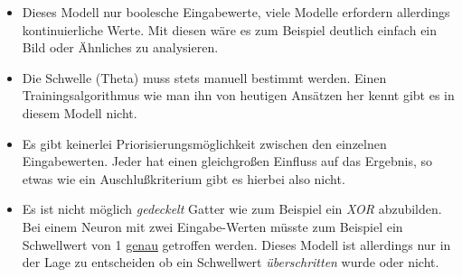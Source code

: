 \begin{minipage}{\textwidth}
\begin{itemize}

\item Dieses Modell  nur boolesche Eingabewerte, viele Modelle erfordern allerdings kontinuierliche Werte. Mit diesen wäre es zum Beispiel deutlich einfach ein Bild oder Ähnliches zu analysieren.

\item Die Schwelle (Theta) muss stets manuell bestimmt werden. Einen Trainingsalgorithmus wie man ihn von heutigen Ansätzen her kennt gibt es in diesem Modell nicht. 

\item Es gibt keinerlei Priorisierungsmöglichkeit zwischen den einzelnen Eingabewerten. Jeder hat einen gleichgroßen Einfluss auf das Ergebnis, so etwas wie ein Auschlußkriterium gibt es hierbei also nicht. 

\item Es ist nicht möglich \emph{gedeckelt} Gatter wie zum Beispiel ein \emph{XOR} abzubilden. Bei einem Neuron mit zwei Eingabe-Werten müsste zum Beispiel ein Schwellwert von 1 \underline{genau} getroffen werden. Dieses Modell ist allerdings nur in der Lage zu entscheiden ob ein Schwellwert \emph{überschritten} wurde oder nicht. 

\end{itemize}
\end{minipage}

